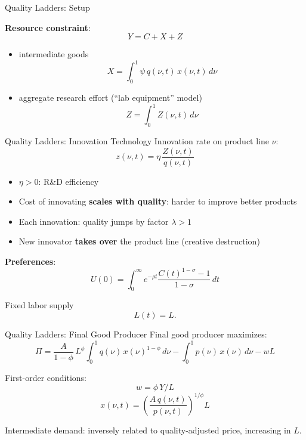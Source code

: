 \documentclass[blue]{beamer}
\begin{document}
		
			\begin{frame}{Quality Ladders: Setup}
	
			
			\textbf{Resource constraint}: 
			$$
			Y = C + X + Z
			$$
			\begin{itemize}
				\item intermediate goods
				$$
				X = \int_0^1 \psi\, q(\nu,t)\, x(\nu,t)\, d\nu
				$$ 
				\item aggregate research effort (``lab equipment'' model)
				$$
				Z = \int_0^1 Z(\nu,t)\, d\nu
				$$

			\end{itemize}
		\end{frame}
		
		\begin{frame}{Quality Ladders: Innovation Technology}
			Innovation rate on product line $\nu$:
			\[
			z(\nu,t) = \eta\, \frac{Z(\nu,t)}{q(\nu,t)}
			\]
			
			\begin{itemize}
				\item $\eta > 0$: R\&D efficiency
				\item Cost of innovating \textbf{scales with quality}: harder to improve better products
				\item Each innovation: quality jumps by factor $\lambda > 1$
				\item New innovator \textbf{takes over} the product line (creative destruction)
			\end{itemize}
			
			\textbf{Preferences}:
			$$
			U(0) = \int_0^\infty e^{-\rho t} \frac{C(t)^{1-\sigma}-1}{1-\sigma}\, dt
			$$
			
			Fixed labor supply
			$$
			L(t) = L.
			$$
		\end{frame}
		
		\begin{frame}{Quality Ladders: Final Good Producer}
			Final good producer maximizes:
			\[
			\Pi = \frac{A}{1-\phi}\, L^\phi \int_0^1 q(\nu)\, x(\nu)^{1-\phi}\, d\nu - \int_0^1 p(\nu)\, x(\nu)\, d\nu - wL
			\]
			
			First-order conditions:
			$$
				w = \phi\, Y / L 
			$$
			$$
				x(\nu,t) = \left(\frac{A\, q(\nu,t)}{p(\nu,t)}\right)^{1/\phi} L 
				$$
			
			Intermediate demand: inversely related to quality-adjusted price, increasing in $L$.
		\end{frame}
		
\end{document}
